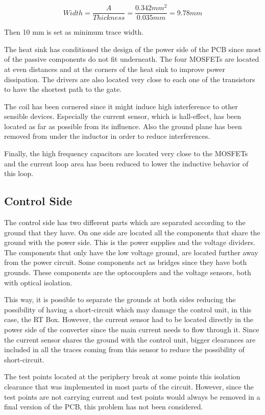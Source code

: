 \begin{equation} \label{width_calc}
Width = \frac{A}{Thickness} = \frac{0.342 mm^2}{0.035 mm} = 9.78 mm
\end{equation}

Then 10 mm is set as minimum trace width.

The heat sink has conditioned the design of the power side of the PCB since most of the passive components do not fit underneath. The four MOSFETs are located at even distances and at the corners of the heat sink to improve power dissipation. The drivers are also located very close to each one of the transistors to have the shortest path to the gate.

The coil has been cornered since it might induce high interference to other sensible devices. Especially the current sensor, which is hall-effect, has been located as far as possible from its influence. Also the ground plane has been removed from under the inductor in order to reduce interferences.

Finally, the high frequency capacitors are located very close to the MOSFETs and the current loop area has been reduced to lower the inductive behavior of this loop. 

\subsection{Control Side} \label{PCB_Control}
The control side has two different parts which are separated according to the ground that they have. On one side are located all the components that share the ground with the power side. This is the power supplies and the voltage dividers. The components that only have the low voltage ground, are located further away from the power circuit. Some components act as bridges since they have both grounds. These components are the optocouplers and the voltage sensors, both with optical isolation.
 
This way, it is possible to separate the grounds at both sides reducing the possibility of having a short-circuit which may damage the control unit, in this case, the RT Box. However, the current sensor had to be located directly in the power side of the converter since the main current needs to flow through it. Since the current sensor shares the ground with the control unit, bigger clearances are included in all the traces coming from this sensor to reduce the possibility of short-circuit. 

The test points located at the periphery break at some points this isolation clearance that was implemented in most parts of the circuit. However, since the test points are not carrying current and test points would always be removed in a final version of the PCB, this problem has not been considered.